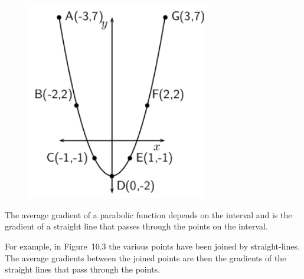 	\begin{figure}[H] %
    \begin{center}
    \label{m39223*id190642!!!underscore!!!media}\label{m39223*id190642!!!underscore!!!printimage}\includegraphics[width=300px]{col11306.imgs/m39223_MG10C12_002.png} %
      \vspace{2pt}
    \vspace{.1in}
    \end{center}
 \end{figure}       
      \par 
      \label{m39223*id190657}The average gradient of a parabolic function depends on the interval and is the gradient of a straight line that passes through the points on the interval.\par 
      \label{m39223*id190661}For example, in Figure~10.3 the various points have been joined by straight-lines. The average gradients between the joined points are then the gradients of the straight lines that pass through the points.\par 
    \setcounter{subfigure}{0}
